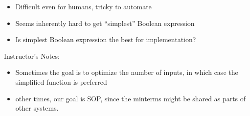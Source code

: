 \begin{frame}[fragile]
\begin{itemize}
\item Difficult even for humans, tricky to automate
\item Seems inherently hard to get ``simplest'' Boolean expression
\item Is simplest Boolean expression the best for implementation? \ifnum{}\fi
\end{itemize}
\BNotes\ifnum{}
Instructor's Notes:
\begin{itemize}
    \item Sometimes the goal is to optimize the number of inputs, in which case the simplified function is preferred
    \item other times, our goal is SOP, since the minterms might be shared as parts of other systems. 
\end{itemize}
\fi\ENotes
\end{frame}




